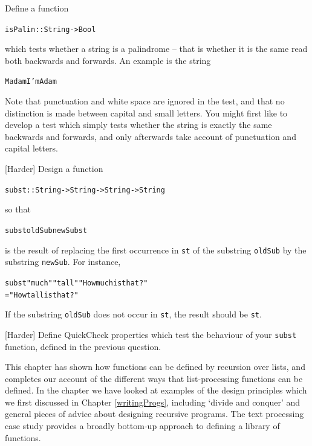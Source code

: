 \begin{exercises}
\item
Define a function
\begin{alltt}
{\hskip1pc}isPalin :: String -> Bool
\end{alltt}
which tests whether a string is a palindrome -- that is whether it is the
same read both backwards and forwards. An example is the string
\begin{alltt}
{\hskip1pc}Madam I'm Adam
\end{alltt}
Note that punctuation and white space are ignored in the test, and that no
distinction is made between capital and small letters. You might first like to
develop a test which simply tests whether the string is exactly the same
backwards and forwards, and only afterwards take account of punctuation and
capital letters.

\item
{[Harder]} Design a function
\begin{alltt}
{\hskip1pc}subst :: String -> String -> String -> String
\end{alltt}
so that
\begin{alltt}
subst oldSub newSub st
\end{alltt}
 is the result of replacing the first
occurrence in \texttt{st} of the substring \texttt{oldSub} by the substring \texttt{newSub}. For instance,
\begin{alltt}
{\hskip1pc}subst "much  " "tall " "How much  is that?"
  = "How tall is that?"
\end{alltt}
If the substring \texttt{oldSub} does not occur in \texttt{st}, the result should
be \texttt{st}.

\item {[Harder]} 
Define QuickCheck properties which test the behaviour of your \texttt{subst} function, defined in the previous question.


\end{exercises}



\begin{summary}
This chapter has shown how functions can be defined by recursion over lists, and 
completes our account of the different ways that list-processing functions can be defined.
In the chapter we have looked at examples of the design
principles which we first discussed in Chapter \ref{writingProgs},
including `divide and conquer' and general pieces of advice about
designing recursive programs. The text processing case study provides a
broadly bottom-up approach to defining a library of functions. 
\end{summary}

%
